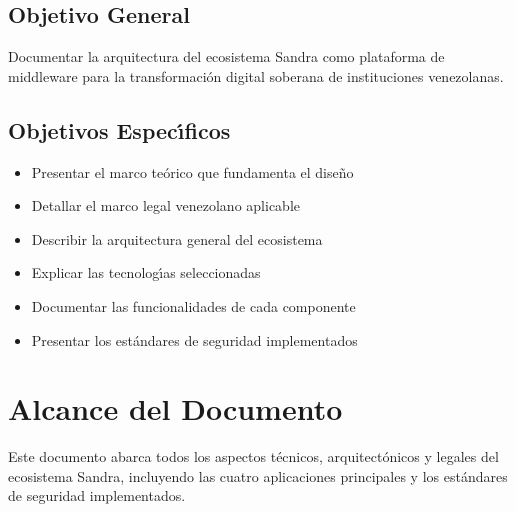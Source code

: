 \subsection{Objetivo General}
Documentar la arquitectura del ecosistema Sandra como plataforma de middleware para la transformaci\'on digital soberana de instituciones venezolanas.

\subsection{Objetivos Espec\'{\i}ficos}
\begin{itemize}
\item Presentar el marco te\'orico que fundamenta el dise\~no
\item Detallar el marco legal venezolano aplicable
\item Describir la arquitectura general del ecosistema
\item Explicar las tecnolog\'{\i}as seleccionadas
\item Documentar las funcionalidades de cada componente
\item Presentar los est\'andares de seguridad implementados
\end{itemize}

\section{Alcance del Documento}

Este documento abarca todos los aspectos t\'ecnicos, arquitect\'onicos y legales del ecosistema Sandra, incluyendo las cuatro aplicaciones principales y los est\'andares de seguridad implementados.

\newpage
